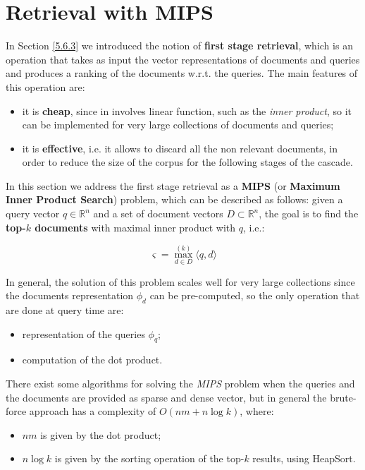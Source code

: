 \section{Retrieval with MIPS}
In Section \ref{5.6.3} we introduced the notion of \textbf{first stage retrieval}, which is an operation that takes as input the vector representations of documents and queries and produces a ranking of the documents w.r.t. the queries. The main features of this operation are:

\begin{itemize}
    \item it is \textbf{cheap}, since in involves linear function, such as the \textit{inner product}, so it can be implemented for very large collections of documents and queries;
    \item it is \textbf{effective}, i.e. it allows to discard all the non relevant documents, in order to reduce the size of the corpus for the following stages of the cascade.
\end{itemize}

In this section we address the first stage retrieval as a \textbf{MIPS} (or \textbf{Maximum Inner Product Search}) problem, which can be described as follows: given a query vector $q \in \mathbb{R}^n$ and a set of document vectors $D \subset \mathbb{R}^n$, the goal is to find the \textbf{top-$k$ documents} with maximal inner product with $q$, i.e.:

$$
\varsigma = \max_{d \in D}^{(k)} \langle q,d \rangle
$$

In general, the solution of this problem scales well for very large collections since the documents representation $\phi_d$ can be pre-computed, so the only operation that are done at query time are:

\begin{itemize}
    \item representation of the queries $\phi_q$;
    \item computation of the dot product.
\end{itemize}

There exist some algorithms for solving the \textit{MIPS} problem when the queries and the documents are provided as sparse and dense vector, but in general the brute-force approach has a complexity of $O(nm + n\log k)$, where:

\begin{itemize}
    \item $nm$ is given by the dot product;
    \item $n \log k$ is given by the sorting operation of the top-$k$ results, using HeapSort.
\end{itemize}

